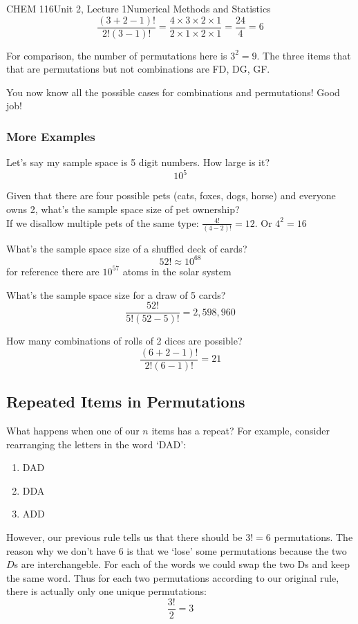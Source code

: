 \documentclass{article}
\begin{document}
\begin{tdoc}{CHEM 116}{Unit 2, Lecture 1}{Numerical Methods and Statistics}
  $$
  \frac{(3 + 2 - 1)!}{2!(3 - 1)!} = \frac{4\times3\times2\times1}{2\times1\times2\times1} = \frac{24}{4} = 6
  $$

  For comparison, the number of permutations here is $3^2 = 9$. The
  three items that that are permutations but not combinations are FD,
  DG, GF.

  You now know all the possible cases for combinations and
  permutations! Good job!

  \subsubsection{More Examples}

  Let's say my sample space is 5 digit numbers. How large is it?\\
  $$10^5$$

  Given that there are four possible pets (cats, foxes, dogs, horse)
  and everyone owns 2, what's the sample space size of pet
  ownership?\\ If we disallow multiple pets of the same type:
  $\frac{4!}{(4 - 2)!} = 12$. Or $4^2 = 16$

  What's the sample space size of a shuffled deck of cards?\\
  $$52! \approx 10^{68}$$
  for reference there are $10^{57}$ atoms in the solar system

  What's the sample space size for a draw of 5 cards?\\
  $$\frac{52!}{5!(52 - 5)!} = 2,598,960$$

  How many combinations of rolls of 2 dices are possible?\\
  $$\frac{(6 + 2 - 1)!}{2!(6 - 1)!} = 21$$

\subsection{Repeated Items in Permutations}

What happens when one of our $n$ items has a repeat? For example, consider rearranging
the letters in the word `DAD':

\begin{enumerate}
\item DAD
\item DDA
\item ADD
\end{enumerate}

However, our previous rule tells us that there should be $3! = 6$ permutations. The reason why we don't have 6 is that we `lose' some permutations because
the two $D$s are interchangeble. For each of the words we could swap the two Ds and keep the same word. Thus for each two permutations according
to our original rule, there is actually only one unique permutations:  $$ \frac{3!}{2} = 3$$


\end{tdoc}
\end{document}
